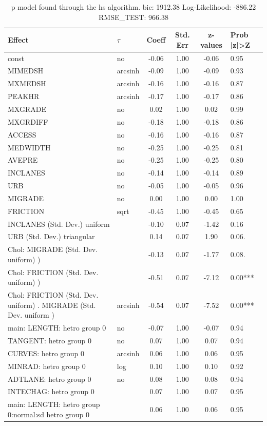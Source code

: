 \begin{table}
	\caption{p model found through the hs algorithm. bic: 1912.38 Log-Likelihood: -886.22 RMSE_TEST: 966.38}
	\begin{center}
		\begin{tabular}{|l|l|c|c|c|l|}
			\hline
			Effect & $\tau$ & Coeff & Std. Err & z-values & Prob |z|>Z \\
			\hline
			const & no & -0.06 & 1.00 & -0.06 & 0.95 \\
			\hline
			MIMEDSH & arcsinh & -0.09 & 1.00 & -0.09 & 0.93 \\
			\hline
			MXMEDSH & arcsinh & -0.16 & 1.00 & -0.16 & 0.87 \\
			\hline
			PEAKHR & arcsinh & -0.17 & 1.00 & -0.17 & 0.86 \\
			\hline
			MXGRADE & no & 0.02 & 1.00 & 0.02 & 0.99 \\
			\hline
			MXGRDIFF & no & -0.18 & 1.00 & -0.18 & 0.86 \\
			\hline
			ACCESS & no & -0.16 & 1.00 & -0.16 & 0.87 \\
			\hline
			MEDWIDTH & no & -0.25 & 1.00 & -0.25 & 0.81 \\
			\hline
			AVEPRE & no & -0.25 & 1.00 & -0.25 & 0.80 \\
			\hline
			INCLANES & no & -0.14 & 1.00 & -0.14 & 0.89 \\
			\hline
			URB & no & -0.05 & 1.00 & -0.05 & 0.96 \\
			\hline
			MIGRADE & no & 0.00 & 1.00 & 0.00 & 1.00 \\
			\hline
			FRICTION & sqrt & -0.45 & 1.00 & -0.45 & 0.65 \\
			\hline
			INCLANES (Std. Dev.) uniform &  & -0.10 & 0.07 & -1.42 & 0.16 \\
			\hline
			URB (Std. Dev.) triangular &  & 0.14 & 0.07 & 1.90 & 0.06. \\
			\hline
			 Chol: MIGRADE (Std. Dev. uniform) ) &  & -0.13 & 0.07 & -1.77 & 0.08. \\
			\hline
			 Chol: FRICTION (Std. Dev. uniform) ) &  & -0.51 & 0.07 & -7.12 & 0.00*** \\
			\hline
			 Chol: FRICTION (Std. Dev. uniform) . MIGRADE (Std. Dev.   uniform ) & arcsinh & -0.54 & 0.07 & -7.52 & 0.00*** \\
			\hline
			main: LENGTH: hetro group 0 & no & -0.07 & 1.00 & -0.07 & 0.94 \\
			\hline
			TANGENT: hetro group 0 & no & 0.07 & 1.00 & 0.07 & 0.94 \\
			\hline
			CURVES: hetro group 0 & arcsinh & 0.06 & 1.00 & 0.06 & 0.95 \\
			\hline
			MINRAD: hetro group 0 & log & 0.10 & 1.00 & 0.10 & 0.92 \\
			\hline
			ADTLANE: hetro group 0 & no & 0.08 & 1.00 & 0.08 & 0.94 \\
			\hline
			INTECHAG: hetro group 0 &  & 0.07 & 1.00 & 0.07 & 0.95 \\
			\hline
			main: LENGTH: hetro group 0:normal:sd  hetro group 0 &  & 0.06 & 1.00 & 0.06 & 0.95 \\
			\hline
		\end{tabular}
	\end{center}
\end{table}